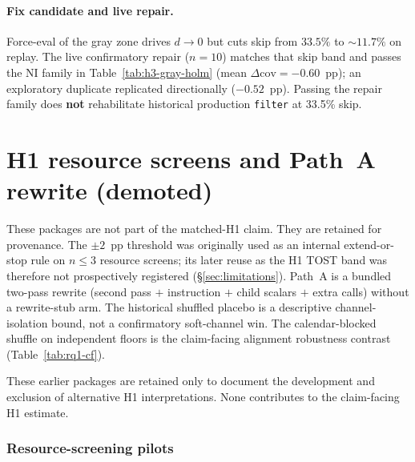 \paragraph{Fix candidate and live repair.}
Force-eval of the gray zone drives $d\!\rightarrow\!0$ but cuts skip from $33.5\%$ to ${\sim}11.7\%$ on replay. The live confirmatory repair ($n{=}10$) matches that skip band and passes the NI family in Table~\ref{tab:h3-gray-holm} (mean $\Delta\text{cov}=-0.60$~pp); an exploratory duplicate replicated directionally ($-0.52$~pp). Passing the repair family does \textbf{not} rehabilitate historical production \texttt{filter} at 33.5\% skip.

\section{H1 resource screens and Path~A rewrite (demoted)}
\label{sec:h1-pilots-appendix}

These packages are not part of the matched-H1 claim. They are retained for provenance. The $\pm 2$~pp threshold was originally used as an internal extend-or-stop rule on $n{\le}3$ resource screens; its later reuse as the H1 TOST band was therefore not prospectively registered (\S\ref{sec:limitations}). Path~A is a bundled two-pass rewrite (second pass $+$ instruction $+$ child scalars $+$ extra calls) without a rewrite-stub arm. The historical shuffled placebo is a descriptive channel-isolation bound, not a confirmatory soft-channel win. The calendar-blocked shuffle on independent floors is the claim-facing alignment robustness contrast (Table~\ref{tab:rq1-cf}).

These earlier packages are retained only to document the development and exclusion of alternative H1 interpretations. None contributes to the claim-facing H1 estimate.

\subsubsection*{Resource-screening pilots}

